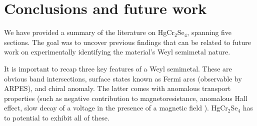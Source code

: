\documentclass[preprint,pre,floats,aps,amsmath,amssymb]{revtex4}
\begin{document}
\section{Conclusions and future work}
\label{sec:conclusion}



We have provided a summary of the literature on HgCr$_2$Se$_4$,  spanning five sections. The goal was to uncover previous findings that can be related to future work on experimentally identifying the material's Weyl semimetal nature.

It is important to recap three key features of a Weyl semimetal. These are obvious band intersections, surface states known as Fermi arcs (observable by ARPES), and chiral anomaly. The latter comes with anomalous transport properties (such as negative contribution to magnetoresistance, anomalous Hall effect, slow decay of a voltage in the presence of a magnetic field \cite{hosur}). HgCr$_2$Se$_4$ has to potential to exhibit all of these.





{}

\end{document}
